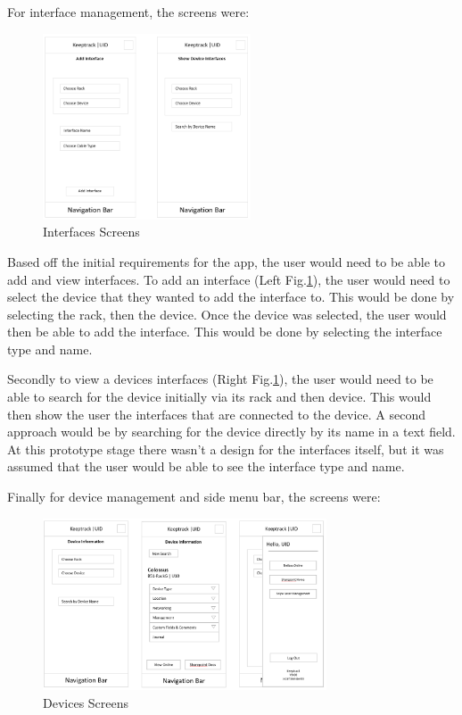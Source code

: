 \documentclass [11pt,a4paper]{article}
\begin{document}
For interface management, the screens were:
\begin{figure}[H]
    \centering
    \includegraphics[width=0.55\textwidth]{images/initial_prototype_interfaces.png}
    \caption{Interfaces Screens}
    \label{fig:low_fidelity_prototypes_interfaces}
\end{figure}

Based off the initial requirements for the app, the user would need to be able to add and view interfaces. To add an interface (Left Fig.\ref{fig:low_fidelity_prototypes_interfaces}), the user would need to select the device that they wanted to add the interface to. This would be done by selecting the rack, then the device. Once the device was selected, the user would then be able to add the interface. This would be done by selecting the interface type and name. 

Secondly to view a devices interfaces (Right Fig.\ref{fig:low_fidelity_prototypes_interfaces}), the user would need to be able to search for the device initially via its rack and then device. This would then show the user the interfaces that are connected to the device. A second approach would be by searching for the device directly by its name in a text field. At this prototype stage there wasn't a design for the interfaces itself, but it was assumed that the user would be able to see the interface type and name. 

Finally for device management and side menu bar, the screens were:
\begin{figure}[H]
    \centering
    \includegraphics[width=0.75\textwidth]{images/initial_prototype_devices.png}
    \caption{Devices Screens}
    \label{fig:low_fidelity_prototypes_devices}
\end{figure}
\end{document}
